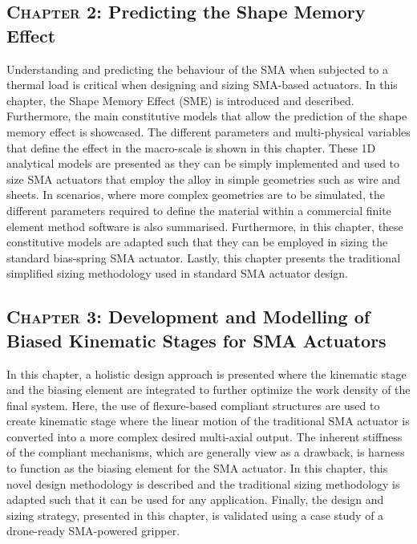 \subsection*{\textsc{Chapter 2}: Predicting the Shape Memory Effect}
Understanding and predicting the behaviour of the SMA when subjected to a thermal load is critical when designing and sizing SMA-based actuators. In this chapter, the Shape Memory Effect (SME) is introduced and described. Furthermore, the main constitutive models that allow the prediction of the shape memory effect is showcased. The different parameters and multi-physical variables that define the effect in the macro-scale is shown in this chapter. These 1D analytical models are presented as they can be simply implemented and used to size SMA actuators that employ the alloy in simple geometries such as wire and sheets. In scenarios, where more complex geometries are to be simulated, the different parameters required to define the material within a commercial finite element method software is also summarised. Furthermore, in this chapter, these constitutive models are adapted such that they can be employed in sizing the standard bias-spring SMA actuator. Lastly, this chapter presents the traditional simplified sizing methodology used in standard SMA actuator design.

\subsection*{\textsc{Chapter 3}: Development and Modelling of Biased Kinematic Stages for SMA Actuators}
In this chapter, a holistic design approach is presented where the kinematic stage and the biasing element are integrated to further optimize the work density of the final system. Here, the use of flexure-based compliant structures are used to create kinematic stage where the linear motion of the traditional SMA actuator is converted into a more complex desired multi-axial output. The inherent stiffness of the compliant mechanisms, which are generally view as a drawback, is harness to function as the biasing element for the SMA actuator. In this chapter, this novel design methodology is described and the traditional sizing methodology is adapted such that it can be used for any application. Finally, the design and sizing strategy, presented in this chapter, is validated using a case study of a drone-ready SMA-powered gripper.

